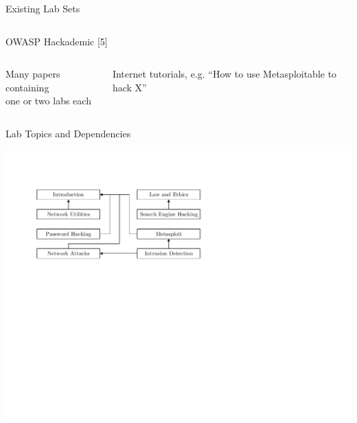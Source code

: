 \documentclass{beamer}
\begin{document}
\begin{frame}{Existing Lab Sets}
\begin{columns}
\begin{column}{0.5\textwidth}
\begin{center}
					OWASP Hackademic [5]
				\end{center}
              		\end{column}
		\end{columns}			
		\vfill
		\begin{columns}
            		\begin{column}{0.5\textwidth}
            		\pause	
			\begin{center}	
			Many papers containing\\one or two labs each
			\end{center}
             		\end{column}
			\pause
            		\begin{column}{0.5\textwidth}				
			\begin{center}
			Internet tutorials, e.g. ``How to use Metasploitable to hack X''
			\end{center}
              		\end{column}
		\end{columns}	
	\end{frame}
	
	\begin{frame}{Lab Topics and Dependencies}
		\begin{center}
		\includegraphics[width=\textwidth,clip=true, trim=0.85in 5in 4.5in 1.2in]{../paper/dependencies-between-labs.pdf}
		\end{center}		
	\end{frame}	
	
\end{document}
